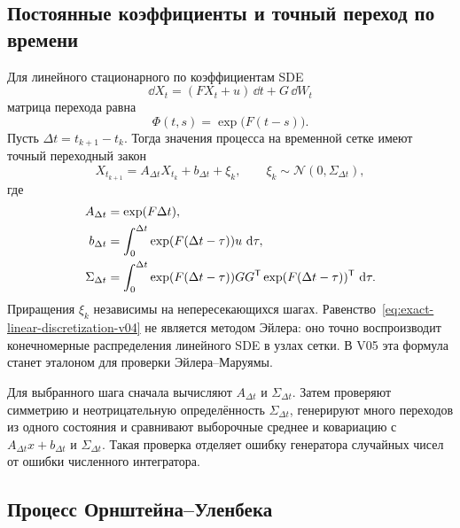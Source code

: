 \subsection{Постоянные коэффициенты и точный переход по времени}

Для линейного стационарного по коэффициентам SDE
\begin{equation}
\label{eq:lti-sde-v04}
\dd X_t
=
(FX_t+u)\,\dd t
+
G\,\dd W_t
\end{equation}
матрица перехода равна
\begin{equation}
\label{eq:lti-transition-v04}
\Phi(t,s)=\exp\bigl(F(t-s)\bigr).
\end{equation}
Пусть $\Delta t=t_{k+1}-t_k$. Тогда значения процесса на временной сетке имеют точный переходный закон
\begin{equation}
\label{eq:exact-linear-discretization-v04}
X_{t_{k+1}}
=
A_{\Delta t}X_{t_k}+b_{\Delta t}+\xi_k,
\qquad
\xi_k\sim\mathcal N(0,\Sigma_{\Delta t}),
\end{equation}
где
\begin{align}
\label{eq:exact-linear-A-v04}
A_{\Delta t}
&=
\exp(F\Delta t),
\\
\label{eq:exact-linear-b-v04}
b_{\Delta t}
&=
\int_0^{\Delta t}\exp(F(\Delta t-\tau))u\,\mathop{}\!\mathrm{d}\tau,
\\
\label{eq:exact-linear-sigma-v04}
\Sigma_{\Delta t}
&=
\int_0^{\Delta t}
\exp(F(\Delta t-\tau))GG^{\mathsf{T}}
\exp(F(\Delta t-\tau))^{\mathsf{T}}\,\mathop{}\!\mathrm{d}\tau.
\end{align}
Приращения $\xi_k$ независимы на непересекающихся шагах. Равенство~\eqref{eq:exact-linear-discretization-v04} не является методом Эйлера: оно точно воспроизводит конечномерные распределения линейного SDE в узлах сетки. В V05 эта формула станет эталоном для проверки Эйлера--Маруямы.

\begin{computationalnote}
Для выбранного шага сначала вычисляют $A_{\Delta t}$ и $\Sigma_{\Delta t}$. Затем проверяют симметрию и неотрицательную определённость $\Sigma_{\Delta t}$, генерируют много переходов из одного состояния и сравнивают выборочные среднее и ковариацию с $A_{\Delta t}x+b_{\Delta t}$ и $\Sigma_{\Delta t}$. Такая проверка отделяет ошибку генератора случайных чисел от ошибки численного интегратора.
\end{computationalnote}

\subsection{Процесс Орнштейна--Уленбека}

